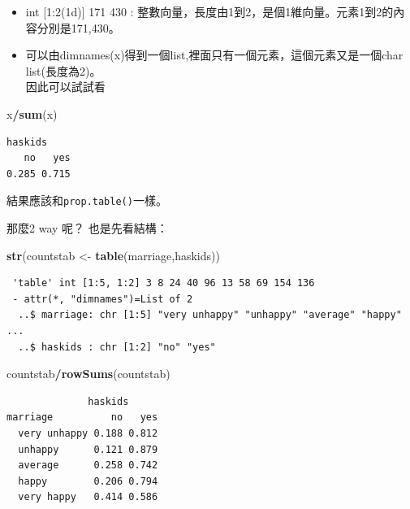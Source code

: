\documentclass[]{book}
\newenvironment{Shaded}{\begin{snugshade}}{\end{snugshade}}
\newcommand{\KeywordTok}[1]{\textcolor[rgb]{0.13,0.29,0.53}{\textbf{#1}}}
\newcommand{\NormalTok}[1]{#1}
\newcommand{\OperatorTok}[1]{\textcolor[rgb]{0.81,0.36,0.00}{\textbf{#1}}}
\newcommand{\StringTok}[1]{\textcolor[rgb]{0.31,0.60,0.02}{#1}}
\providecommand{\tightlist}{%
  \setlength{\itemsep}{0pt}\setlength{\parskip}{0pt}}
\theoremstyle{definition}
\theoremstyle{definition}
\theoremstyle{definition}
\theoremstyle{remark}
\begin{document}
\begin{itemize}
\tightlist
\item
  int {[}1:2(1d){]} 171 430 :
  整數向量，長度由1到2，是個1維向量。元素1到2的內容分別是171,430。\\
\item
  可以由dimnames(x)得到一個list,裡面只有一個元素，這個元素又是一個char
  list(長度為2)。\\
  因此可以試試看
\end{itemize}

\begin{Shaded}
\begin{Highlighting}[]
\NormalTok{x}\OperatorTok{/}\KeywordTok{sum}\NormalTok{(x)}
\end{Highlighting}
\end{Shaded}

\begin{verbatim}
haskids
   no   yes 
0.285 0.715 
\end{verbatim}

結果應該和\texttt{prop.table()}一樣。

那麼2 way 呢？ 也是先看結構：

\begin{Shaded}
\begin{Highlighting}[]
\KeywordTok{str}\NormalTok{(countstab <-}\StringTok{ }\KeywordTok{table}\NormalTok{(marriage,haskids))}
\end{Highlighting}
\end{Shaded}

\begin{verbatim}
 'table' int [1:5, 1:2] 3 8 24 40 96 13 58 69 154 136
 - attr(*, "dimnames")=List of 2
  ..$ marriage: chr [1:5] "very unhappy" "unhappy" "average" "happy" ...
  ..$ haskids : chr [1:2] "no" "yes"
\end{verbatim}

\begin{Shaded}
\begin{Highlighting}[]
\NormalTok{ countstab}\OperatorTok{/}\KeywordTok{rowSums}\NormalTok{(countstab)}
\end{Highlighting}
\end{Shaded}

\begin{verbatim}
              haskids
marriage          no   yes
  very unhappy 0.188 0.812
  unhappy      0.121 0.879
  average      0.258 0.742
  happy        0.206 0.794
  very happy   0.414 0.586
\end{verbatim}
\end{document}
